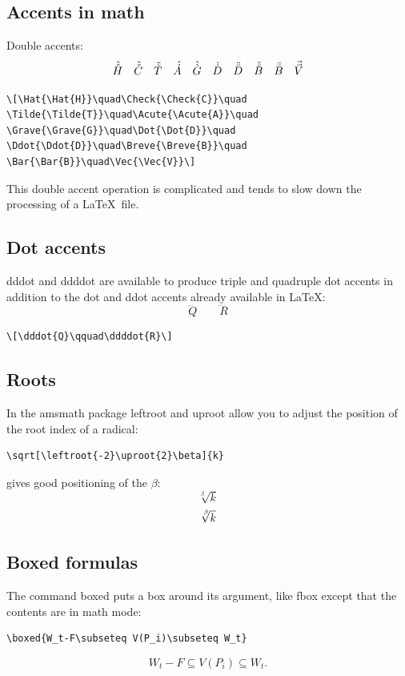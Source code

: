 \documentclass{article}
\newcommand{\ntt}{\normalfont\ttfamily}
\newcommand{\cn}[1]{{\protect\ntt\bslash#1}}
\newcommand{\pkg}[1]{{\protect\ntt#1}}
\theoremstyle{definition}
\theoremstyle{remark}
\begin{document}
\subsection{Accents in math}

Double accents:
\[\Hat{\Hat{H}}\quad\Check{\Check{C}}\quad
\Tilde{\Tilde{T}}\quad\Acute{\Acute{A}}\quad
\Grave{\Grave{G}}\quad\Dot{\Dot{D}}\quad
\Ddot{\Ddot{D}}\quad\Breve{\Breve{B}}\quad
\Bar{\Bar{B}}\quad\Vec{\Vec{V}}\]
\begin{verbatim}
\[\Hat{\Hat{H}}\quad\Check{\Check{C}}\quad
\Tilde{\Tilde{T}}\quad\Acute{\Acute{A}}\quad
\Grave{\Grave{G}}\quad\Dot{\Dot{D}}\quad
\Ddot{\Ddot{D}}\quad\Breve{\Breve{B}}\quad
\Bar{\Bar{B}}\quad\Vec{\Vec{V}}\]
\end{verbatim}
This double accent operation is complicated
and tends to slow down the processing of a \LaTeX\ file.


\subsection{Dot accents}
\cn{dddot} and \cn{ddddot} are available to
produce triple and quadruple dot accents
in addition to the \cn{dot} and \cn{ddot} accents already available
in \LaTeX:
\[\dddot{Q}\qquad\ddddot{R}\]
\begin{verbatim}
\[\dddot{Q}\qquad\ddddot{R}\]
\end{verbatim}

\subsection{Roots}

In the \pkg{amsmath} package \cn{leftroot} and \cn{uproot} allow you to adjust
the position of the root index of a radical:
\begin{verbatim}
\sqrt[\leftroot{-2}\uproot{2}\beta]{k}
\end{verbatim}
gives good positioning of the $\beta$:
\[\sqrt[\beta]{k}\]
\[\sqrt[\leftroot{-2}\uproot{2}\beta]{k}\]

\subsection{Boxed formulas} The command \cn{boxed} puts a box around its
argument, like \cn{fbox} except that the contents are in math mode:
\begin{verbatim}
\boxed{W_t-F\subseteq V(P_i)\subseteq W_t}
\end{verbatim}
\[\boxed{W_t-F\subseteq V(P_i)\subseteq W_t}.\]
\end{document}

